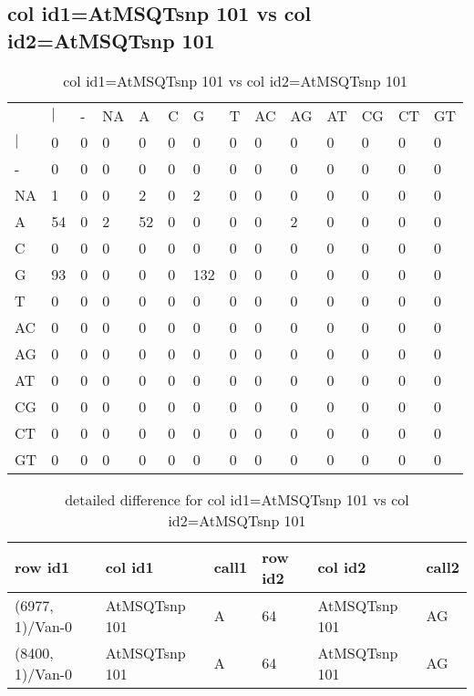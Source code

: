 \subsection{col id1=AtMSQTsnp 101 vs col id2=AtMSQTsnp 101}
\begin{center}
\begin{longtable}{|l|l|l|l|l|l|l|l|l|l|l|l|l|l|}
\caption{col id1=AtMSQTsnp 101 vs col id2=AtMSQTsnp 101} \label{table_dm686}\\
\hline
\\
\hline
&$|$&-&NA&A&C&G&T&AC&AG&AT&CG&CT&GT\\
$|$&0&0&0&0&0&0&0&0&0&0&0&0&0\\
-&0&0&0&0&0&0&0&0&0&0&0&0&0\\
NA&1&0&0&2&0&2&0&0&0&0&0&0&0\\
A&54&0&2&52&0&0&0&0&2&0&0&0&0\\
C&0&0&0&0&0&0&0&0&0&0&0&0&0\\
G&93&0&0&0&0&132&0&0&0&0&0&0&0\\
T&0&0&0&0&0&0&0&0&0&0&0&0&0\\
AC&0&0&0&0&0&0&0&0&0&0&0&0&0\\
AG&0&0&0&0&0&0&0&0&0&0&0&0&0\\
AT&0&0&0&0&0&0&0&0&0&0&0&0&0\\
CG&0&0&0&0&0&0&0&0&0&0&0&0&0\\
CT&0&0&0&0&0&0&0&0&0&0&0&0&0\\
GT&0&0&0&0&0&0&0&0&0&0&0&0&0\\
\hline
\end{longtable}
\end{center}

\begin{center}
\begin{longtable}{|l|l|l|l|l|l|}
\caption{detailed difference for col id1=AtMSQTsnp 101 vs col id2=AtMSQTsnp 101} \label{table_dm687}\\
\hline
row id1&col id1&call1&row id2&col id2&call2\\
\hline
(6977, 1)/Van-0&AtMSQTsnp 101&A&64&AtMSQTsnp 101&AG\\
(8400, 1)/Van-0&AtMSQTsnp 101&A&64&AtMSQTsnp 101&AG\\
\hline
\end{longtable}
\end{center}

